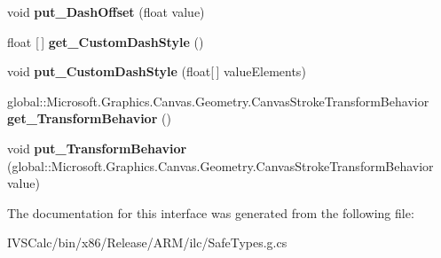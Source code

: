 \begin{DoxyCompactItemize}
void {\bfseries put\+\_\+\+Dash\+Offset} (float value)
\item 
\mbox{\label{interface_microsoft_1_1_graphics_1_1_canvas_1_1_geometry_1_1_i_canvas_stroke_style_a01ec98472128934fc496593cee96dff2}} 
float \mbox{[}$\,$\mbox{]} {\bfseries get\+\_\+\+Custom\+Dash\+Style} ()
\item 
\mbox{\label{interface_microsoft_1_1_graphics_1_1_canvas_1_1_geometry_1_1_i_canvas_stroke_style_afc2f9171bd8e3a6ef7927abcbd756c59}} 
void {\bfseries put\+\_\+\+Custom\+Dash\+Style} (float\mbox{[}$\,$\mbox{]} value\+Elements)
\item 
\mbox{\label{interface_microsoft_1_1_graphics_1_1_canvas_1_1_geometry_1_1_i_canvas_stroke_style_a8c19df45244410757192563987bfbdfa}} 
global\+::\+Microsoft.\+Graphics.\+Canvas.\+Geometry.\+Canvas\+Stroke\+Transform\+Behavior {\bfseries get\+\_\+\+Transform\+Behavior} ()
\item 
\mbox{\label{interface_microsoft_1_1_graphics_1_1_canvas_1_1_geometry_1_1_i_canvas_stroke_style_ac482e23f3ef5eebc025715899d1deb51}} 
void {\bfseries put\+\_\+\+Transform\+Behavior} (global\+::\+Microsoft.\+Graphics.\+Canvas.\+Geometry.\+Canvas\+Stroke\+Transform\+Behavior value)
\end{DoxyCompactItemize}


The documentation for this interface was generated from the following file\+:\begin{DoxyCompactItemize}
\item 
I\+V\+S\+Calc/bin/x86/\+Release/\+A\+R\+M/ilc/Safe\+Types.\+g.\+cs\end{DoxyCompactItemize}
